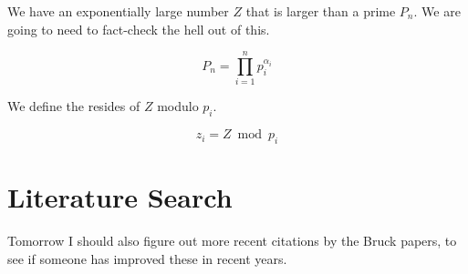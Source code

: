 \documentclass{article}
\begin{document}
We have an exponentially large number $Z$ that is larger than
a prime $P_n$. We are going to need to fact-check the hell out of this.

\begin{equation}
P_n = \prod_{i=1}^n p_i^{\alpha_i}
\end{equation}

We define the resides of $Z$ modulo $p_i$.

\begin{equation}
z_i = Z \bmod p_i
\end{equation}

\section{Literature Search}

Tomorrow I should also figure out more recent citations by the Bruck papers,
to see if someone has improved these in recent years.
\end{document}
